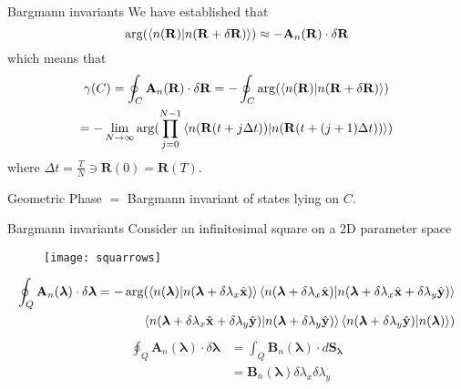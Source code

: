 \documentclass{beamer}
\begin{document}
\begin{frame}{Bargmann invariants}
\small We have established that 
\begin{equation*}
 \arg(\braket{n(\mathbf{R})|n(\mathbf{R} +\delta\mathbf{R})}) \approx -\mathbf{A}_{n}(\mathbf{R}) \cdot \delta\mathbf{R}
\end{equation*} which means that
\begin{multline*}
 \label{chap_2:geombargmanninv}\gamma(C) = \oint_{C}{\mathbf{A}_{n}(\mathbf{R}) \cdot \delta\mathbf{R}}  = -\oint_{C}{\arg(\braket{n(\mathbf{R})|n(\mathbf{R} +\delta\mathbf{R})})} \\ = -\lim_{N\rightarrow\infty} \arg(\prod_{j=0}^{N-1}{\braket{n(\mathbf{R}(t + j\Delta t))|n(\mathbf{R}(t + (j+1)\Delta t))}})
\end{multline*} where $\Delta t = \frac{T}{N} \ni \mathbf{R}(0)=\mathbf{R}(T)$. \normalsize
\begin{theorem}
Geometric Phase $=$ Bargmann invariant of states lying on $C$.
\end{theorem}
\end{frame}

\begin{frame}{Bargmann invariants}
Consider an infinitesimal square on a 2D parameter space
\begin{figure}[h]
 \centering
 \texttt{[image: squarrows]}
\end{figure}
\footnotesize
\begin{equation*}
\begin{split}
  \oint_{Q}{\mathbf{A}_{n}(\bm{\lambda})\cdot \delta\bm{\lambda}} = -\arg(\braket{n(\bm{\lambda})|n(\bm{\lambda} + \delta\lambda_x \hat{\mathbf{x}})}\braket{n(\bm{\lambda} + \delta\lambda_x \hat{\mathbf{x}})|n(\bm{\lambda} + \delta\lambda_x \hat{\mathbf{x}} + \delta\lambda_y \hat{\mathbf{y}})}\\ \braket{n(\bm{\lambda} + \delta\lambda_x \hat{\mathbf{x}} + \delta\lambda_y \hat{\mathbf{y}})|n(\bm{\lambda} + \delta\lambda_y \hat{\mathbf{y}})}\braket{n(\bm{\lambda} + \delta\lambda_y \hat{\mathbf{y}})|n(\bm{\lambda})})
\end{split}
\end{equation*}
\begin{align*}
\oint_{Q}{\mathbf{A}_{n}(\bm{\lambda})\cdot \delta\bm{\lambda}} &= \int_{Q}{\mathbf{B}_{n}(\bm{\lambda})\cdot d\mathbf{S}_{\bm{\lambda}}}\\
  &= \mathbf{B}_{n}(\bm{\lambda}) \delta\lambda_x\delta\lambda_y 
\end{align*}
\normalsize
\end{frame}
\end{document}
